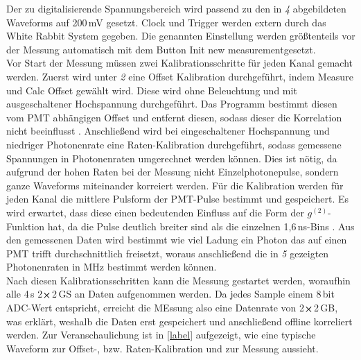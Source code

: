 Der zu digitalisierende Spannungsbereich wird passend zu den in \emph{4} abgebildeten Waveforms auf 200\,mV gesetzt. 
Clock und Trigger werden extern durch das White Rabbit System gegeben. 
Die genannten Einstellung werden größtenteils vor der Messung automatisch mit dem Button \glqq Init new measurement\grqq\;gesetzt. \\
Vor Start der Messung müssen zwei Kalibrationsschritte für jeden Kanal gemacht werden. 
Zuerst wird unter \emph{2} eine Offset Kalibration durchgeführt, indem \glqq Measure\grqq\; und \glqq Calc Offset\grqq\; gewählt wird. 
Diese wird ohne Beleuchtung und mit ausgeschaltener Hochspannung durchgeführt. 
Das Programm bestimmt diesen vom PMT abhängigen Offset und entfernt diesen, sodass dieser die Korrelation nicht beeinflusst \cite{zmijaOpticalIntensityInterferometry2021}. 
Anschließend wird bei eingeschaltener Hochspannung und niedriger Photonenrate eine Raten-Kalibration durchgeführt, sodass gemessene Spannungen in Photonenraten umgerechnet werden können. 
Dies ist nötig, da aufgrund der hohen Raten bei der Messung nicht Einzelphotonepulse, sondern ganze Waveforms miteinander korreiert werden. 
Für die Kalibration werden für jeden Kanal die mittlere Pulsform der PMT-Pulse bestimmt und gespeichert. 
Es wird erwartet, dass diese einen bedeutenden Einfluss auf die Form der $g^{(2)}$-Funktion hat, da die Pulse deutlich breiter sind als die einzelnen 1,6\,ns-Bins \cite{zmijaOpticalIntensityInterferometry2021}. 
Aus den gemessenen Daten wird bestimmt wie viel Ladung ein Photon das auf einen PMT trifft durchschnittlich freisetzt, woraus anschließend die in \emph{5} gezeigten Photonenraten in MHz bestimmt werden können. \\
Nach diesen Kalibrationsschritten kann die Messung gestartet werden, woraufhin alle 4\,s 2$\cross$2\,GS an Daten aufgenommen werden. 
Da jedes Sample einem 8\,bit ADC-Wert entspricht, erreicht die MEssung also eine Datenrate von 2$\cross$2\,GB, was erklärt, weshalb die Daten erst gespeichert und anschließend offline korreliert werden.  
Zur Veranschaulichung ist in \autoref{label} aufgezeigt, wie eine typische Waveform zur Offset-, bzw. Raten-Kalibration und zur Messung aussieht. 



